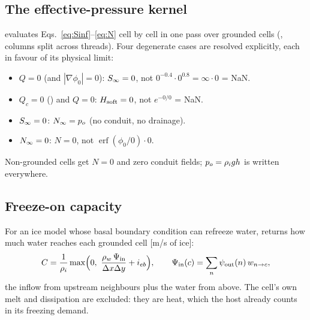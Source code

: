 \subsection{The effective-pressure kernel}\label{disc:N}
 evaluates Eqs.~\eqref{eq:Sinf}--\eqref{eq:N} cell by cell in one pass over grounded cells
(, columns split across threads). Four degenerate cases are resolved explicitly, each
in favour of its physical limit:
\begin{itemize}[leftmargin=1.5em,itemsep=0pt]
\item $Q = 0$ (and $|\nabla\phi_0| = 0$): ${S_\infty} = 0$, not $0^{-0.4}\cdot0^{0.8} = \infty\cdot0$ = NaN.
\item $Q_c = 0$ () and $Q = 0$: $H_{\rm soft} = 0$, not $e^{-0/0}$ = NaN.
\item ${S_\infty} = 0$: ${N_\infty} = p_o$ (no conduit, no drainage).
\item ${N_\infty} = 0$: $N = 0$, not $\operatorname{erf}(\phi_0/0)\cdot0$.
\end{itemize}
Non-grounded cells get $N = 0$ and zero conduit fields; $p_o = {\rho_i} g h$ is written everywhere.

\subsection{Freeze-on capacity}\label{disc:freeze}
For an ice model whose basal boundary condition can refreeze water,  returns how much water
reaches each grounded cell [m/s of ice]:
\begin{equation}
C = \frac{1}{\rhoi}\max\Bigl(0,\ \frac{\rhow\,\Psi_{\rm in}}{\Dx\Dy} + \ieb\Bigr),\qquad
\Psi_{\rm in}(c) = \sum_{n} \psiout(n)\,w_{n\to c},
\end{equation}
the inflow from upstream neighbours plus the water from above. The cell's own melt and dissipation are excluded:
they are heat, which the host already counts in its freezing demand.
